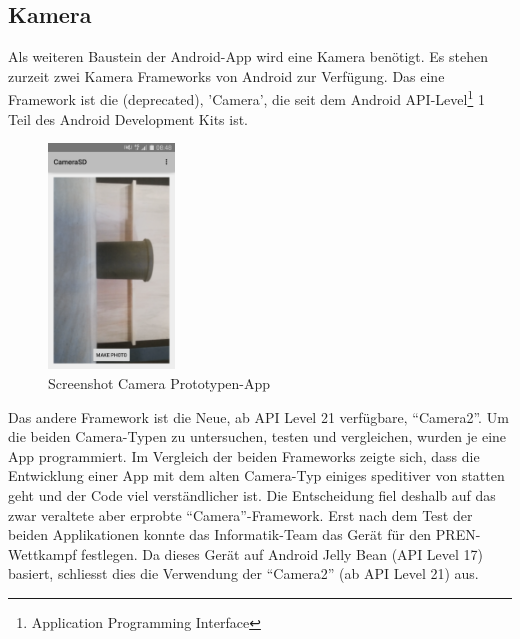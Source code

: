 \subsection{Kamera}
Als weiteren Baustein der Android-App wird eine Kamera benötigt. Es stehen zurzeit 
zwei Kamera Frameworks von Android zur Verfügung. Das eine Framework ist die (deprecated)‚ 
'Camera', die seit dem Android API-Level\footnote{Application Programming Interface} 1 Teil des 
Android Development Kits ist.
\newline
\begin{figure}[h!]
	\includegraphics[width=0.3\textwidth,clip,trim=0mm 0mm 0mm 0mm]
	{Enddokumentation/Bilder/Screenshot_CameraSD.png}
	\centering
	\caption{Screenshot Camera Prototypen-App}
	\label{abb:ScreenshotCameraSD}
\end{figure}
Das andere Framework ist die Neue, ab API Level 21 verfügbare‚ 
 \enquote{Camera2}. Um die beiden Camera-Typen zu untersuchen, testen und vergleichen, wurden je eine App programmiert.
Im Vergleich der beiden Frameworks zeigte sich, dass die Entwicklung einer App mit dem alten Camera-Typ 
einiges speditiver von statten geht und der Code viel verständlicher ist. Die Entscheidung fiel deshalb 
auf das zwar veraltete aber erprobte  \enquote{Camera}-Framework.
\newline
\newline
Erst nach dem Test der beiden Applikationen konnte das Informatik-Team das Gerät für den PREN-Wettkampf festlegen. 
Da dieses Gerät auf Android Jelly Bean (API Level 17) basiert, schliesst dies die Verwendung 
der  \enquote{Camera2} (ab API Level 21) aus.
